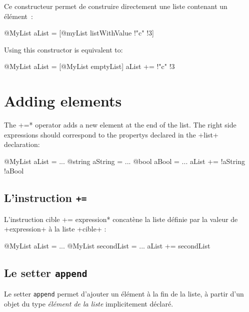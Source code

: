 Ce constructeur permet de construire directement une liste contenant un élément~:

\begin{galgas}
@MyList aList = [@myList listWithValue !"c" !3]
\end{galgas}


Using this constructor is equivalent to:

\begin{galgas}
@MyList aList = [@MyList emptyList]
aList += !"c" !3
\end{galgas}

\section{Adding elements}


The  \ggs*+=* operator adds a new element at the end of the list. The right side expressions should correspond to the propertys declared in the \ggs+list+ declaration:\\

\begin{galgas}
@MyList aList = ...
@string aString = ...
@bool aBool = ...
aList += !aString !aBool
\end{galgas}


\subsection{L'instruction \texttt{+=}}

L'instruction \ggs*cible += expression* concatène la liste définie par la valeur de \ggs+expression+ à la liste \ggs+cible+ :

\begin{galgas}
@MyList aList = ...
@MyList secondList = ...
aList += secondList
\end{galgas}







\subsection{Le setter \texttt{append}}

Le setter \texttt{append} permet d'ajouter un élément à la fin de la liste, à partir d'un objet du type \emph{élément de la liste} implicitement déclaré.


